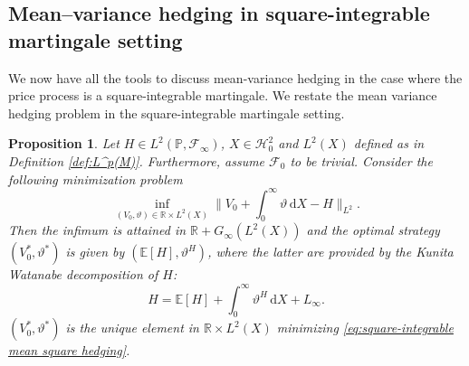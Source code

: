 \documentclass[11pt,a4paper,twoside,openany]{report}
\numberwithin{equation}{section}
\newcommand{\diff}{\mathrm{d}}
\theoremstyle{plain} %
\newtheorem{proposition}[theorem]{Proposition}
\theoremstyle{definition} %
\theoremstyle{remark} %
\begin{document}
\subsection{Mean--variance hedging in square-integrable martingale setting}\label{sec:Mean Variance Hedging in square-integrable martingale setting}
We now have all the tools to discuss mean-variance hedging in the case where the price process is a square-integrable martingale. We restate the mean variance hedging problem in the square-integrable martingale setting.
\begin{proposition}\label{prop:square-integrable mean variance via KW}
    Let \(H\in L^2(\mathbb{P},\mathcal{F}_{\infty})\), \(X\in\mathcal{H}_{0}^2\) and \(L^2(X)\) defined as in Definition \ref{def:L^p(M)}. Furthermore, assume \(\mathcal{F}_0\) to be trivial.
    Consider the following minimization problem
    \begin{equation}\label{eq:square-integrable mean square hedging}
        \inf_{(V_0,\vartheta)\in \mathbb{R}\times L^2(X)}\lVert V_0+\int_{0}^{\infty}\vartheta\,\diff X-H\rVert_{L^2}.
    \end{equation}
    Then the infimum is attained in \(\mathbb{R}+G_{\infty}(L^2(X))\) and the optimal strategy \((V_0^*,\vartheta^*)\) is given by \((\mathbb{E}[H],\vartheta^H)\), where the latter are provided by the Kunita Watanabe decomposition of \(H\):
    \begin{equation*}
        H = \mathbb{E}[H]+\int_0^{\infty}\vartheta^H\,\diff X+L_{\infty}.
    \end{equation*}
    \((V_0^*,\vartheta^*)\) is the unique element in \(\mathbb{R}\times L^2(X)\) minimizing \eqref{eq:square-integrable mean square hedging}.
\end{proposition}
\end{document}
